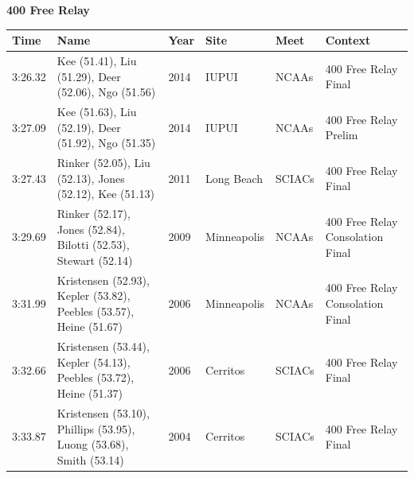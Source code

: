 \vspace{1.2em}
\noindent\begin{minipage}[t]{0.98\textwidth}
\centering
\textbf{\textcolor{teamprimary}{400 Free Relay}}\par
\vspace{0.5em}
\centering
\small
\renewcommand{\arraystretch}{1.0}
\setlength{\tabcolsep}{4pt}
\begin{tabular}{@{}p{2.0cm}p{3.2cm}p{1.2cm}p{2.0cm}p{2.0cm}p{2.5cm}@{}}
\toprule
\textbf{Time} & \textbf{Name} & \textbf{Year} & \textbf{Site} & \textbf{Meet} & \textbf{Context} \\
\midrule
3:26.32 & Kee (51.41), Liu (51.29), Deer (52.06), Ngo (51.56) & 2014 & IUPUI & NCAAs & 400 Free Relay Final \\
3:27.09 & Kee (51.63), Liu (52.19), Deer (51.92), Ngo (51.35) & 2014 & IUPUI & NCAAs & 400 Free Relay Prelim \\
3:27.43 & Rinker (52.05), Liu (52.13), Jones (52.12), Kee (51.13) & 2011 & Long Beach & SCIACs & 400 Free Relay Final \\
3:29.69 & Rinker (52.17), Jones (52.84), Bilotti (52.53), Stewart (52.14) & 2009 & Minneapolis & NCAAs & 400 Free Relay Consolation Final \\
3:31.99 & Kristensen (52.93), Kepler (53.82), Peebles (53.57), Heine (51.67) & 2006 & Minneapolis & NCAAs & 400 Free Relay Consolation Final \\
3:32.66 & Kristensen (53.44), Kepler (54.13), Peebles (53.72), Heine (51.37) & 2006 & Cerritos & SCIACs & 400 Free Relay Final \\
3:33.87 & Kristensen (53.10), Phillips (53.95), Luong (53.68), Smith (53.14) & 2004 & Cerritos & SCIACs & 400 Free Relay Final \\
\bottomrule
\end{tabular}
\end{minipage}
\vspace{1.2em}
